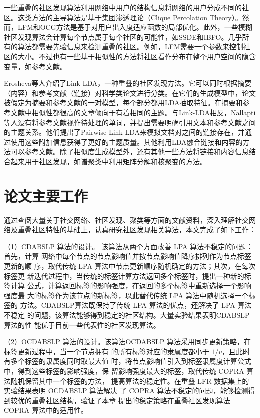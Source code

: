 一些重叠的社区发现算法利用网络中用户的结构信息将网络的用户分成不同的社区。这类方法的主导算法是基于集团渗透理论（Clique Percolation Theory）\cite{Palla2005Uncovering}。然而，LFM和OCG方法是基于对用户出入度适应函数的局部优化\cite{Lancichinetti2012Detecting,Becker2012Multifunctional}。此外，一些模糊社区发现算法会计算每个节点属于每个社区的可能性，如SSDE和IBFO\cite{Magdon2010SSDE,Lei2013Clustering}。几乎所有的算法都需要先验信息来检测重叠的社区。例如，LFM需要一个参数来控制社区的大小。不过也有一些基于相似性的方法将社区看作分布在整个用户空间的隐含变量，如参考文献\cite{Ren2007A}。

Erosheva等人\cite{Erosheva2004Mixed}介绍了Link-LDA，一种重叠的社区发现方法。它可以同时根据摘要（内容）和参考文献（链接）对科学类论文进行分类。在它们的生成模型中，论文被假定为摘要和参考文献的一对模型，每个部分都用LDA抽取特征。在摘要和参考文献中相似性都很高的文章倾向于有着相同的主题。与Link-LDA相反，Nallapti等人\cite{Nallapati2008Joint}没有将参考文献视作待处理的单词，并提出需要明确引用文本和参考文献之间的主题关系。他们提出了Pairwise-Link-LDA来模拟文档对之间的链接存在，并通过使用这些附加信息获得了更好的主题质量。其他利用LDA融合链接和内容的方法可以参考文献\cite{Dietz2007Unsupervised,Gruber2008Latent}。除了相似度生成模型外，还有其他一些方法将链接和内容信息结合起来用于社区发现，如谱聚类中利用矩阵分解和核聚变的方法\cite{Zhu2007Combining,Yu2008Clustering}。

\section{论文主要工作}

通过查阅大量关于社交网络、社区发现、聚类等方面的文献资料，深入理解社交网络及重叠社区特性的基础上，认真研究社区发现相关算法，本文完成了如下工作：

（1）CDABSLP 算法的设计。
该算法从两个方面改善 LPA 算法不稳定的问题：首先，计算
网络中每个节点的节点影响值并按节点影响值降序排列作为节点标签更新的顺
序，取代传统 LPA 算法中节点更新顺序随机确定的方法；其次，在每次标签更
新迭代过程中，当传统的标签计算方法返回多个标签时，提出一种新的标签计算
公式，计算返回标签的影响强度，在返回的多个标签中重新选择一个影响强度最
大的标签作为该节点的新标签，以此替代传统 LPA 算法中随机选择一个标签的
方法。CDABSLP算法既保持了传统 LPA 算法的优点，还解决了 LPA 算法不稳定
的问题，该算法能够得到稳定的社区结构。大量实验结果表明CDABSLP算法的性
能优于目前一些代表性的社区发现算法。 

（2）OCDABSLP 算法的设计。该算法OCDABSLP 算法采用同步更新策略，在标签更新过程中，当一个节点拥有
的所有标签对应的隶属度都小于 $1/v$，且此时有多个标签的隶属度同时取最大值
时，将节点影响值引入到标签隶属度计算公式中，得到这些标签的影响强度，保
留影响强度最大的标签，取代传统 COPRA 算法随机保留其中一个标签的方法，
提高算法的稳定性。在重叠 LFR 数据集上的实验结果表明 OCDABSLP 算法解决
了 COPRA 算法不稳定的问题，能够检测得到较优的重叠社区结构，验证了本章
提出的稳定策略在重叠社区发现算法 COPRA 算法中的适用性。



